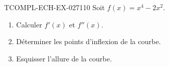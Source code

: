\begin{exercice}{TCOMPL-ECH-EX-027}{1}{10}
Soit $f(x) = x^4 - 2x^2$.
\begin{enumerate}
  \item Calculer $f'(x)$ et $f''(x)$.
  \item Déterminer les points d'inflexion de la courbe.
  \item Esquisser l'allure de la courbe.
\end{enumerate}

\end{exercice}
